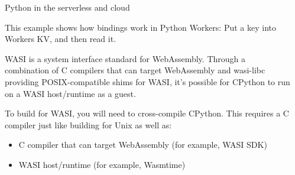 \documentclass[final]{beamer}
\newlength{\sepwidth}
\newlength{\colwidth}
\newcommand{\separatorcolumn}{\begin{column}{\sepwidth}\end{column}}
\begin{document}
\begin{frame}[t]
\begin{columns}[t]
\begin{column}{\colwidth}
\begin{block}{ Python in the serverless and cloud}
\begin{minipage}[t]{\textwidth}
                    

                This example shows how bindings work in Python Workers: Put a key into Workers KV, and then read it.  \newline
                 \end{minipage}

   
                 \newline
     \begin{minipage}[t]{\textwidth}
                WASI is a system interface standard for WebAssembly. Through a combination of C compilers that can target WebAssembly and wasi-libc providing POSIX-compatible shims for WASI, it’s possible for CPython to run on a WASI host/runtime as a guest. \newline

                To build for WASI, you will need to cross-compile CPython. This requires a C compiler just like building for Unix as well as:
                
  \begin{itemize}
  
  \item C compiler that can target WebAssembly (for example, WASI SDK)

  \item WASI host/runtime (for example, Wasmtime)
  \end{itemize}
                 \end{minipage}

                    
                \end{block}

        
            \end{column}
                \separatorcolumn
\end{columns}
\end{frame}
\end{document}
